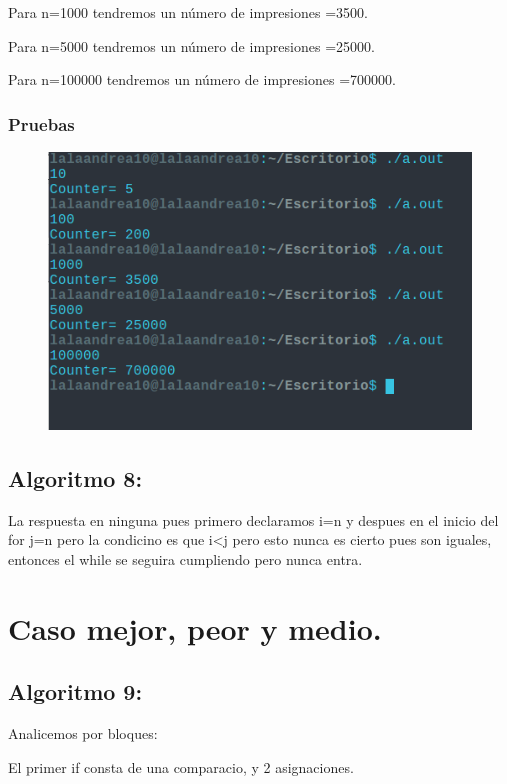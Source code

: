\documentclass[12pt, fleqn]{article}                             %
\theoremstyle{break}                                            %
\begin{document}
    Para n=1000 tendremos un número de impresiones =3500.

    Para n=5000 tendremos un número de impresiones =25000.

    Para n=100000 tendremos un número de impresiones =700000.

    \subsubsection{Pruebas}
    
    \begin{figure}[H]
               \centering
                \includegraphics[scale=.5]{7P.png}
            \end{figure}
    \subsection{Algoritmo 8:}
    
    La respuesta en ninguna pues primero declaramos i=n y despues en el inicio del for j=n pero la condicino es que i<j pero esto nunca es cierto pues son iguales, entonces el while se seguira cumpliendo pero nunca entra.
    \section{Caso mejor, peor y medio.}
    \subsection{Algoritmo 9:}
    
    Analicemos por bloques:

    El primer if consta de una comparacio, y 2 asignaciones.
\end{document}
